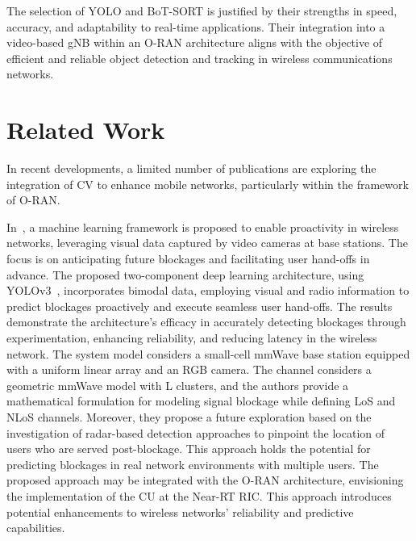 The selection of YOLO and BoT-SORT is justified by their strengths in speed, accuracy, and adaptability to real-time applications.
Their integration into a video-based gNB within an O-RAN architecture aligns with the objective of efficient and reliable object detection and tracking in wireless communications networks.



\section{Related Work}\label{sec:rel_work}
In recent developments, a limited number of publications are exploring the integration of CV to enhance mobile networks, particularly within the framework of O-RAN\@.

In~\cite{Block_predict}, a machine learning framework is proposed to enable proactivity in wireless networks, leveraging visual data captured by video cameras at base stations.
The focus is on anticipating future blockages and facilitating user hand-offs in advance.
The proposed two-component deep learning architecture, using YOLOv3~\cite{YOLOv3}, incorporates bimodal data, employing visual and radio information to predict blockages proactively and execute seamless user hand-offs.
The results demonstrate the architecture's efficacy in accurately detecting blockages through experimentation, enhancing reliability, and reducing latency in the wireless network.
The system model considers a small-cell mmWave base station equipped with a uniform linear array and an RGB camera.
The channel considers a geometric mmWave model with L clusters, and the authors provide a mathematical formulation for modeling signal blockage while defining LoS and NLoS channels.
Moreover, they propose a future exploration based on the investigation of radar-based detection approaches to pinpoint the location of users who are served post-blockage.
This approach holds the potential for predicting blockages in real network environments with multiple users.
The proposed approach may be integrated with the O-RAN architecture, envisioning the implementation of the CU at the Near-RT RIC. This approach introduces potential enhancements to wireless networks' reliability and predictive capabilities.

